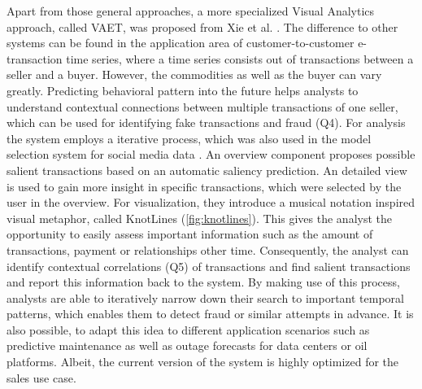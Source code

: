 \documentclass[electronic]{vgtc}             %
\begin{document}
Apart from those general approaches, a more specialized Visual Analytics approach, called VAET, was proposed from Xie et al. \cite{Xie:2014}.
The difference to other systems can be found in the application area of customer-to-customer e-transaction time series, where a time series consists out of transactions between a seller and a buyer.
However, the commodities as well as the buyer can vary greatly.
Predicting behavioral pattern into the future helps analysts to understand contextual connections between multiple transactions of one seller, which can be used for identifying fake transactions and fraud (Q4).
For analysis the system employs a iterative process, which was also used in the model selection system for social media data \cite{koepp:2014}.
An overview component proposes possible salient transactions based on an automatic saliency prediction. 
An detailed view is used to gain more insight in specific transactions, which were selected by the user in the overview.
For visualization, they introduce a musical notation inspired visual metaphor, called KnotLines (\autoref{fig:knotlines}).
This gives the analyst the opportunity to easily assess important information such as the amount of transactions, payment or relationships other time. 
Consequently, the analyst can identify contextual correlations (Q5) of transactions and find salient transactions and report this information back to the system. 
By making use of this process, analysts are able to iteratively narrow down their search to important temporal patterns, which enables them to detect fraud or similar attempts in advance. 
It is also possible, to adapt this idea to different application scenarios such as predictive maintenance as well as outage forecasts for data centers or oil platforms.
Albeit, the current version of the system is highly optimized for the sales use case. 
\end{document}
